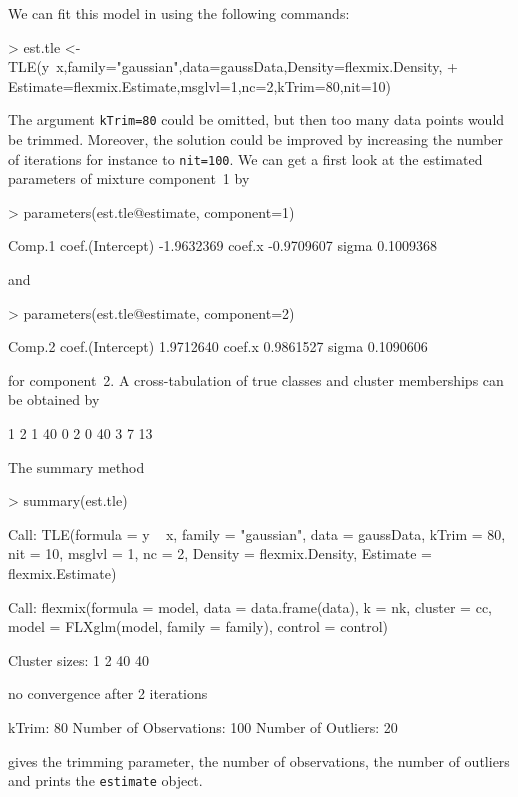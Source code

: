 \documentclass[article,shortnames,nojss]{jss}
\newcommand{\R}{\proglang{R}}
\begin{document}
We can fit this model in \R{} using the following commands:
\begin{Schunk}
\begin{Sinput}
> est.tle <- TLE(y~x,family="gaussian",data=gaussData,Density=flexmix.Density,
+ 		Estimate=flexmix.Estimate,msglvl=1,nc=2,kTrim=80,nit=10)
\end{Sinput}
\end{Schunk}
The argument \verb|kTrim=80| could be omitted, but then too many data points
would be trimmed. Moreover, the solution could be improved by increasing
the number of iterations for instance to \verb|nit=100|.
We can get a first look at the estimated parameters of mixture component~1 by
\begin{Schunk}
\begin{Sinput}
> parameters(est.tle@estimate, component=1)
\end{Sinput}
\begin{Soutput}
                     Comp.1
coef.(Intercept) -1.9632369
coef.x           -0.9709607
sigma             0.1009368
\end{Soutput}
\end{Schunk}
and
\begin{Schunk}
\begin{Sinput}
> parameters(est.tle@estimate, component=2)
\end{Sinput}
\begin{Soutput}
                    Comp.2
coef.(Intercept) 1.9712640
coef.x           0.9861527
sigma            0.1090606
\end{Soutput}
\end{Schunk}
for component~2. A cross-tabulation of true classes and cluster
memberships can be obtained by
\begin{Schunk}
\begin{Soutput}
     1  2
  1 40  0
  2  0 40
  3  7 13
\end{Soutput}
\end{Schunk}
The summary method
\begin{Schunk}
\begin{Sinput}
> summary(est.tle)
\end{Sinput}
\begin{Soutput}
Call:
TLE(formula = y ~ x, family = "gaussian", data = gaussData, 
    kTrim = 80, nit = 10, msglvl = 1, nc = 2, Density = flexmix.Density, 
    Estimate = flexmix.Estimate)


Call:
flexmix(formula = model, data = data.frame(data), 
    k = nk, cluster = cc, model = FLXglm(model, family = family), 
    control = control)

Cluster sizes:
 1  2 
40 40 

no convergence after 2 iterations

kTrim: 80    Number of Observations: 100    Number of Outliers: 20 
\end{Soutput}
\end{Schunk}
gives the trimming parameter, the number of observations, the number of outliers and prints the \texttt{estimate} object.
\end{document}
